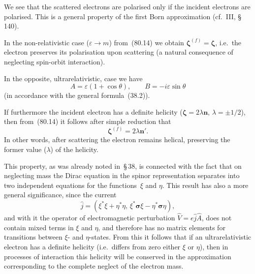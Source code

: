 We see that the scattered electrons are polarised only if the incident electrons are polarised. This is a general property of the first Born approximation (cf.~III, \S\,140).

In the non-relativistic case ($\varepsilon \to m$) from~(80.14) we obtain $\boldsymbol{\zeta}^{(f)} = \boldsymbol{\zeta}$, i.e.\ the electron preserves its polarisation upon scattering (a natural consequence of neglecting spin-orbit interaction).

In the opposite, ultrarelativistic, case we have
\[
A = \varepsilon(1 + \cos\theta),\qquad B = -i\varepsilon\sin\theta
\]
(in accordance with the general formula~(38.2)).

If furthermore the incident electron has a definite helicity ($\boldsymbol{\zeta} = 2\lambda\mathbf{n}$, $\lambda = \pm 1/2$), then from~(80.14) it follows after simple reduction that
\[
\boldsymbol{\zeta}^{(f)} = 2\lambda\mathbf{n}'.
\]
In other words, after scattering the electron remains helical, preserving the former value ($\lambda$) of the helicity.

This property, as was already noted in~\S\,38, is connected with the fact that on neglecting mass the Dirac equation in the spinor representation separates into two independent equations for the functions~$\xi$ and $\eta$. This result has also a more general significance, since the current
\[
\hat{j} = (\xi^*\xi + \eta^*\eta,\, \xi^*\boldsymbol{\sigma}\xi - \eta^*\boldsymbol{\sigma}\eta),
\]
and with it the operator of electromagnetic perturbation $\hat{V} = e\hat{j}\hat{A}$, does not contain mixed terms in $\xi$ and $\eta$, and therefore has no matrix elements for transitions between $\xi$- and $\eta$-states. From this it follows that if an ultrarelativistic electron has a definite helicity (i.e.\ differs from zero either $\xi$ or $\eta$), then in processes of interaction this helicity will be conserved in the approximation corresponding to the complete neglect of the electron mass.
